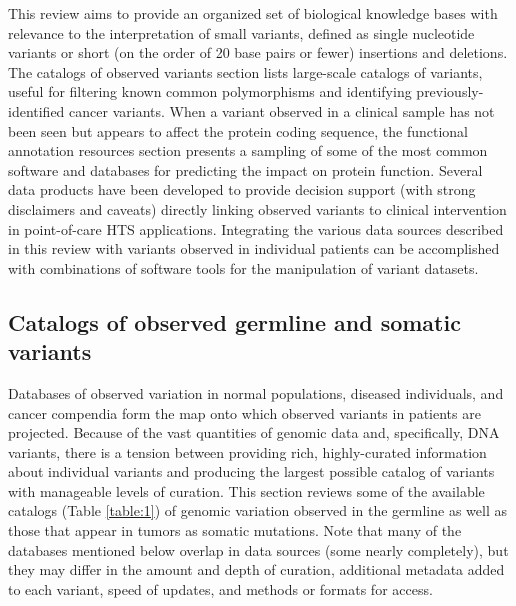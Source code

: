 \documentclass{article}
\begin{document}
This review aims to provide
an organized set of biological knowledge bases with relevance to the
interpretation of small variants, defined as single nucleotide
variants or short (on the order of 20 base pairs or fewer) insertions
and deletions. The catalogs of observed variants section lists
large-scale catalogs of variants, useful for filtering known common
polymorphisms and identifying previously-identified cancer
variants. When a variant observed in a clinical sample has not been
seen but appears to affect the protein coding sequence, the functional
annotation resources section presents a sampling of some of the most
common software and databases for predicting the impact on protein
function. Several data products have been developed to provide
decision support (with strong disclaimers and caveats) directly
linking observed variants to clinical intervention in point-of-care
HTS applications. Integrating the various data sources described in
this review with variants observed in individual patients can be
accomplished with combinations of software tools for the manipulation
of variant datasets.

\subsection{Catalogs of observed germline and somatic variants}

Databases of observed variation in normal populations,
diseased individuals, and cancer compendia form the map onto which
observed variants in patients are projected. Because of the vast
quantities of genomic data and, specifically, DNA variants, there is a
tension between providing rich, highly-curated information about
individual variants and producing the largest possible catalog of
variants with manageable levels of curation. This section reviews some
of the available catalogs (Table \ref{table:1}) of genomic variation observed
in the germline as well as those that appear in tumors as somatic
mutations.  Note that many of the databases mentioned below overlap in
data sources (some nearly completely), but they may differ in the
amount and depth of curation, additional metadata added to each
variant, speed of updates, and methods or formats for access.
\end{document}
